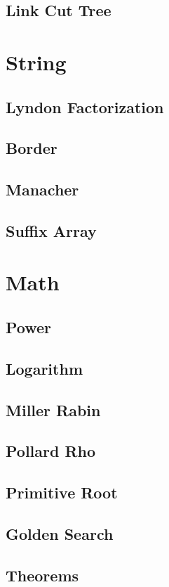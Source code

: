 \documentclass{article}
\begin{document}
\begin{multicols}{2}
    \subsection{Link Cut Tree}
    

    \section{String}
    \subsection{Lyndon Factorization}
    
    \subsection{Border}
    
    \subsection{Manacher}
    
    \subsection{Suffix Array}
    

    \section{Math}
    \subsection{Power}
    
    \subsection{Logarithm}
    
    \subsection{Miller Rabin}
    
    \subsection{Pollard Rho}
    
    \subsection{Primitive Root}
    
    \subsection{Golden Search}
    
    \subsection{Theorems}
    
\end{multicols}
\end{document}
